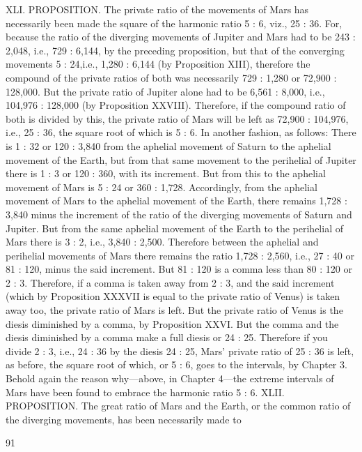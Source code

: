 \documentclass{article}
\begin{document}
XLI. PROPOSITION. The private ratio of the movements of Mars has
necessarily been made the square of the harmonic ratio 5 : 6, viz., 25 :
36.
For, because the ratio of the diverging movements of Jupiter and Mars
had to be 243 : 2,048, i.e., 729 : 6,144, by the preceding proposition, but
that of the converging movements 5 : 24,i.e., 1,280 : 6,144 (by
Proposition XIII), therefore the compound of the private ratios of both
was necessarily 729 : 1,280 or 72,900 : 128,000. But the private ratio of
Jupiter alone had to be 6,561 : 8,000, i.e., 104,976 : 128,000 (by
Proposition XXVIII). Therefore, if the compound ratio of both is divided
by this, the private ratio of Mars will be left as 72,900 : 104,976, i.e., 25 :
36, the square root of which is 5 : 6.
In another fashion, as follows: There is 1 : 32 or 120 : 3,840 from the
aphelial movement of Saturn to the aphelial movement of the Earth, but
from that same movement to the perihelial of Jupiter there is 1 : 3 or 120
: 360, with its increment. But from this to the aphelial movement of
Mars is 5 : 24 or 360 : 1,728. Accordingly, from the aphelial movement of
Mars to the aphelial movement of the Earth, there remains 1,728 : 3,840
minus the increment of the ratio of the diverging movements of Saturn
and Jupiter. But from the same aphelial movement of the Earth to the
perihelial of Mars there is 3 : 2, i.e., 3,840 : 2,500. Therefore between the
aphelial and perihelial movements of Mars there remains the ratio 1,728
: 2,560, i.e., 27 : 40 or 81 : 120, minus the said increment. But 81 : 120 is
a comma less than 80 : 120 or 2 : 3. Therefore, if a comma is taken away
from 2 : 3, and the said increment (which by Proposition XXXVII is
equal to the private ratio of Venus) is taken away too, the private ratio of
Mars is left. But the private ratio of Venus is the diesis diminished by a
comma, by Proposition XXVI. But the comma and the diesis diminished
by a comma make a full diesis or 24 : 25. Therefore if you divide 2 :
3, i.e., 24 : 36 by the diesis 24 : 25, Mars’ private ratio of 25 : 36 is left, as
before, the square root of which, or 5 : 6, goes to the intervals, by
Chapter 3.
Behold again the reason why—above, in Chapter 4—the extreme
intervals of Mars have been found to embrace the harmonic ratio 5 : 6.
XLII. PROPOSITION. The great ratio of Mars and the Earth, or the
common ratio of the diverging movements, has been necessarily made to


91
\end{document}
